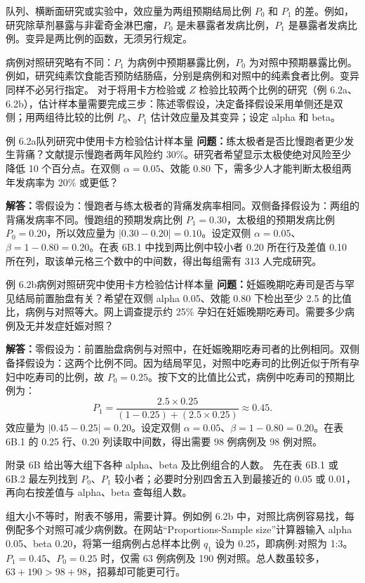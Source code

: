 队列、横断面研究或实验中，效应量为两组预期结局比例 $P_0$ 和 $P_1$ 的差。例如，研究除草剂暴露与非霍奇金淋巴瘤，$P_0$ 是未暴露者发病比例，$P_1$ 是暴露者发病比例。变异是两比例的函数，无须另行规定。

病例对照研究略有不同：$P_1$ 为病例中预期暴露比例，$P_0$ 为对照中预期暴露比例。例如，研究纯素饮食能否预防结肠癌，分别是病例和对照中的纯素食者比例。变异同样不必另行指定。
对于将用卡方检验或 $Z$ 检验比较两个比例的研究（例 6.2a、6.2b），估计样本量需要完成三步：陈述零假设，决定备择假设采用单侧还是双侧；用两组待比较的比例 $P_0$、$P_1$ 估计效应量及其变异；设定 alpha 和 beta。
\begin{bookbox}{例 6.2a\quad 队列研究中使用卡方检验估计样本量}
\textbf{问题：}练太极者是否比慢跑者更少发生背痛？文献提示慢跑者两年风险约 30\%。研究者希望显示太极使绝对风险至少降低 10 个百分点。在双侧 $\alpha=0.05$、效能 0.80 下，需多少人才能判断太极组两年发病率为 20\% 或更低？

\textbf{解答：}零假设为：慢跑者与练太极者的背痛发病率相同。双侧备择假设为：两组的背痛发病率不同。慢跑组的预期发病比例 $P_1=0.30$，太极组的预期发病比例 $P_0=0.20$，所以效应量为 $|0.30-0.20|=0.10$。设定双侧 $\alpha=0.05$、$\beta=1-0.80=0.20$。在表 6B.1 中找到两比例中较小者 0.20 所在行及差值 0.10 所在列，取该单元格三个数中的中间数，得出每组需有 313 人完成研究。
\end{bookbox}
\begin{bookbox}{例 6.2b\quad 病例对照研究中使用卡方检验估计样本量}
\textbf{问题：}妊娠晚期吃寿司是否与罕见结局前置胎盘有关？希望在双侧 alpha 0.05、效能 0.80 下检出至少 2.5 的比值比，病例与对照等大。网上调查提示约 25\% 孕妇在妊娠晚期吃寿司。需要多少病例及无并发症妊娠对照？

\textbf{解答：}零假设为：前置胎盘病例与对照中，在妊娠晚期吃寿司者的比例相同。双侧备择假设为：这两个比例不同。因为结局罕见，对照中吃寿司的比例近似于所有孕妇中吃寿司的比例，故 $P_0=0.25$。按下文的比值比公式，病例中吃寿司的预期比例为：
\[
P_1=\frac{2.5\times0.25}{(1-0.25)+(2.5\times0.25)}\approx0.45.
\]
效应量为 $|0.45-0.25|=0.20$。设定双侧 $\alpha=0.05$、$\beta=1-0.80=0.20$。在表 6B.1 的 0.25 行、0.20 列读取中间数，得出需要 98 例病例及 98 例对照。
\end{bookbox}
附录 6B 给出等大组下各种 alpha、beta 及比例组合的人数。
先在表 6B.1 或 6B.2 最左列找到 $P_0$、$P_1$ 较小者；必要时分别四舍五入到最接近的 0.05 或 0.01，再向右按差值与 alpha、beta 查每组人数。

组大小不等时，附表不够用，需要计算。例如例 6.2b 中，对照比病例容易找，每例配多个对照可减少病例数。在网站“Proportions-Sample size”计算器输入 alpha 0.05、beta 0.20，将第一组病例占总样本比例 $q_1$ 设为 0.25，即病例:对照为 1:3。$P_1=0.45$、$P_0=0.25$ 时，仅需 63 例病例及 190 例对照。总人数虽较多，$63+190>98+98$，招募却可能更可行。

